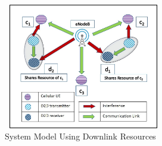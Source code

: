 \documentclass[times]{dacauth}
\begin{document}
\begin{figure}[t]
	{ %
		\setlength{\fboxsep}{1.5pt}%
		\setlength{\fboxrule}{1.5pt}%
		\centering
		\includegraphics[width=70mm, height=55mm]{Graph/SystemModel.jpg}
		\caption{System Model Using Downlink Resources} \label{fig:system_model}
	}
\end{figure}

%			
\end{document}
